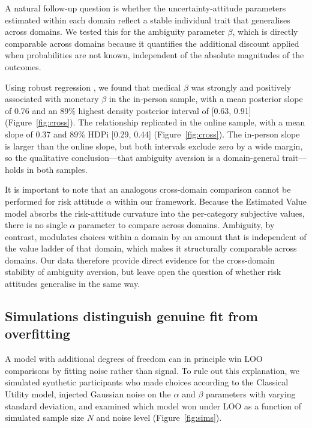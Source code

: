 \documentclass[11pt]{article}
\begin{document}
A natural follow-up question is whether the uncertainty-attitude parameters estimated within each domain reflect a stable individual trait that generalises across domains. We tested this for the ambiguity parameter $\beta$, which is directly comparable across domains because it quantifies the additional discount applied when probabilities are not known, independent of the absolute magnitudes of the outcomes.

Using robust regression \citep{wu2016loss}, we found that medical $\beta$ was strongly and positively associated with monetary $\beta$ in the in-person sample, with a mean posterior slope of 0.76 and an 89\% highest density posterior interval of [0.63, 0.91] (Figure~\ref{fig:cross}). The relationship replicated in the online sample, with a mean slope of 0.37 and 89\% HDPi [0.29, 0.44] (Figure~\ref{fig:cross}). The in-person slope is larger than the online slope, but both intervals exclude zero by a wide margin, so the qualitative conclusion---that ambiguity aversion is a domain-general trait---holds in both samples.

It is important to note that an analogous cross-domain comparison cannot be performed for risk attitude $\alpha$ within our framework. Because the Estimated Value model absorbs the risk-attitude curvature into the per-category subjective values, there is no single $\alpha$ parameter to compare across domains. Ambiguity, by contrast, modulates choices within a domain by an amount that is independent of the value ladder of that domain, which makes it structurally comparable across domains. Our data therefore provide direct evidence for the cross-domain stability of ambiguity aversion, but leave open the question of whether risk attitudes generalise in the same way.

\subsection{Simulations distinguish genuine fit from overfitting}

A model with additional degrees of freedom can in principle win LOO comparisons by fitting noise rather than signal. To rule out this explanation, we simulated synthetic participants who made choices according to the Classical Utility model, injected Gaussian noise on the $\alpha$ and $\beta$ parameters with varying standard deviation, and examined which model won under LOO as a function of simulated sample size $N$ and noise level (Figure~\ref{fig:sims}).
\end{document}
